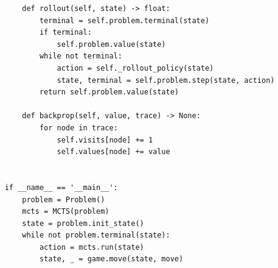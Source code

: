 \documentclass[a4paper,10pt]{article}
\begin{document}
\begin{verbatim}
        def rollout(self, state) -> float:
            terminal = self.problem.terminal(state)
            if terminal:
                self.problem.value(state)
            while not terminal:
                action = self._rollout_policy(state)
                state, terminal = self.problem.step(state, action)
            return self.problem.value(state)
    
        def backprop(self, value, trace) -> None:
            for node in trace:
                self.visits[node] += 1
                self.values[node] += value
                
    
    if __name__ == '__main__':
        problem = Problem()
        mcts = MCTS(problem)
        state = problem.init_state()
        while not problem.terminal(state):
            action = mcts.run(state)
            state, _ = game.move(state, move)
    
    \end{verbatim}
\end{document}
